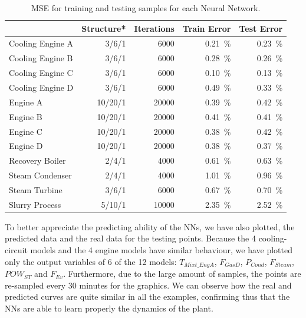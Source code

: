 \begin{table}[!t]
\caption{MSE for training and testing samples for each Neural Network.}
\label{tbl:mse}
  \centering
\begin{tabular}{lrrrr} \toprule
 & Structure* & Iterations & Train Error & Test Error \\ \midrule
Cooling Engine A & 3/6/1 & \num{6000} & \SI{0.21}{\percent} & \SI{0.23}{\percent} \\
Cooling Engine B & 3/6/1 & \num{6000} & \SI{0.28}{\percent} & \SI{0.26}{\percent} \\
Cooling Engine C & 3/6/1 & \num{6000} & \SI{0.10}{\percent} & \SI{0.13}{\percent} \\
Cooling Engine D & 3/6/1 & \num{6000} & \SI{0.49}{\percent} & \SI{0.33}{\percent} \\
 Engine A & 10/20/1 & \num{20000} & \SI{0.39}{\percent} & \SI{0.42}{\percent} \\
 Engine B & 10/20/1 & \num{20000} & \SI{0.41}{\percent} & \SI{0.41}{\percent} \\
 Engine C & 10/20/1 & \num{20000} & \SI{0.38}{\percent} & \SI{0.42}{\percent} \\
 Engine D & 10/20/1 & \num{20000} & \SI{0.38}{\percent} & \SI{0.37}{\percent} \\
 Recovery Boiler & 2/4/1 & \num{4000} & \SI{0.61}{\percent} & \SI{0.63}{\percent} \\
 Steam Condenser & 2/4/1 & \num{4000} & \SI{1.01}{\percent} & \SI{0.96}{\percent} \\
 Steam Turbine & 3/6/1 & \num{6000} & \SI{0.67}{\percent} & \SI{0.70}{\percent} \\
 Slurry Process & 5/10/1 & \num{10000} & \SI{2.35}{\percent} & \SI{2.52}{\percent} \\
 \bottomrule
\end{tabular}
\vspace{-0.3cm}

\end{table}


To better appreciate the predicting ability of the NNs, we have also plotted, the predicted data and the real data for the testing points. Because the 4 cooling-circuit models and the 4 engine models have  similar behaviour, we have plotted only the output variables of 6 of the 12 models: $T_{Mixt\_EngA}$, $F_{GasD}$, $P_{Cond}$, $F_{Steam}$, $POW_{ST}$ and $F_{Ev}$. Furthermore, due to the large amount of samples, the points are re-sampled every 30 minutes for the graphics. We can observe how the  real and predicted curves are quite similar in all the examples, confirming thus that the NNs are able to learn properly the dynamics of the plant.


